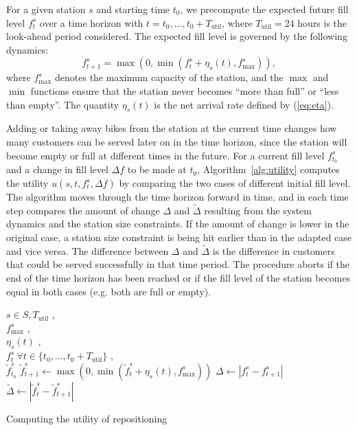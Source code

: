 \documentclass{article}
\providecommand{\Tutil}{T_{\textrm{util}}}
\begin{document}
For a given station $s$ and starting time $t_0$, we precompute the expected
future fill level $f^s_t$ over a time horizon with $t = t_0, \ldots,
t_0+\Tutil$, where $\Tutil = 24$ hours is the look-ahead period considered. The
expected fill level is governed by the following dynamics:
\begin{equation}
\label{eq:fillupdate}
f^s_{t+1} = \max\left(0, \min(f^s_t+\eta_s(t),f^s_{\max})\right),
\end{equation}
where $f^s_{\max}$ denotes the maximum capacity of the station, and the $\max$
and $\min$ functions ensure that the station never becomes ``more than full'' or
``less than empty''. The quantity $\eta_s(t)$ is the net arrival rate defined by
(\ref{eq:eta}).

Adding or taking away bikes from the station at the current time changes how
many customers can be served later on in the time horizon, since the station
will become empty or full at different times in the future. For a current fill
level $f^s_{t_0}$ and a change in fill level $\Delta f$ to be made at $t_0$,
Algorithm~\ref{alg:utility} computes the utility $u(s,t,f^s_t,\Delta f)$ by
comparing the two cases of different initial fill level. The algorithm moves
through the time horizon forward in time, and in each time step compares the
amount of change $\Delta$ and $\tilde \Delta$ resulting from the system dynamics
and the station size constraints. If the amount of change is lower in the
original case, a station size constraint is being hit earlier than in the
adapted case and vice versa. The difference between $\Delta$ and $\tilde \Delta$
is the difference in customers that could be served successfully in that time
period. The procedure aborts if the end of the time horizon has been
reached or if the fill level of the station becomes equal in both cases (e.g.
both are full or empty).
\begin{algorithm}
\begin{algorithmic}[1]
\Require $s\in S, \Tutil$ , \\
$f^s_{\max}$ , \\
$\eta_s(t)$ , \\
$f^s_t\ \forall t\in \{t_0, \ldots, t_0+\Tutil\}$ , \\
$\tilde f^s_{t_0}$ 
\If{$\tilde f^s_t = f^s_t$ \textbf{or} $t \geq \Tutil$}
\State {}
\EndIf
\State $\tilde f^s_{t+1} \leftarrow \max(0, \min(\tilde f^s_t+\eta_s(t),f^s_{\max}))$
\State $\Delta \leftarrow |f^s_t-f^s_{t+1}|$
\State $\tilde \Delta \leftarrow |\tilde f^s_t - \tilde f^s_{t+1}|$
\State {}
\EndProcedure
\end{algorithmic}
\caption{Computing the utility of repositioning}
\label{alg:utility}
\end{algorithm}
\end{document}
